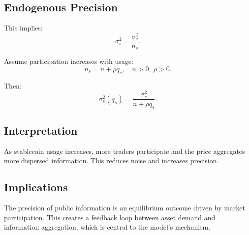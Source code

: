 \subsection{Endogenous Precision}

This implies:
\begin{equation}
\sigma_s^2 = \frac{\sigma_\nu^2}{n_s}.
\end{equation}

Assume participation increases with usage:
\begin{equation}
n_s = \bar{n} + \rho q_s, \quad \bar{n} > 0, \ \rho > 0.
\end{equation}

Then:
\begin{equation}
\sigma_s^2(q_s) = \frac{\sigma_\nu^2}{\bar{n} + \rho q_s}.
\end{equation}

\subsection{Interpretation}

As stablecoin usage increases, more traders participate and the price aggregates more dispersed information. This reduces noise and increases precision.

\subsection{Implications}

The precision of public information is an equilibrium outcome driven by market participation. This creates a feedback loop between asset demand and information aggregation, which is central to the model's mechanism.
